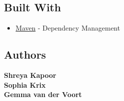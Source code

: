 \hypertarget{built-with}{%
\subsection{Built With}\label{built-with}}

\begin{itemize}
\tightlist
\item
  \href{https://maven.apache.org/}{Maven} - Dependency Management
\end{itemize}

\hypertarget{authors}{%
\subsection{Authors}\label{authors}}

\textbf{Shreya Kapoor}\\
\textbf{Sophia Krix}\\
\textbf{Gemma van der Voort}
